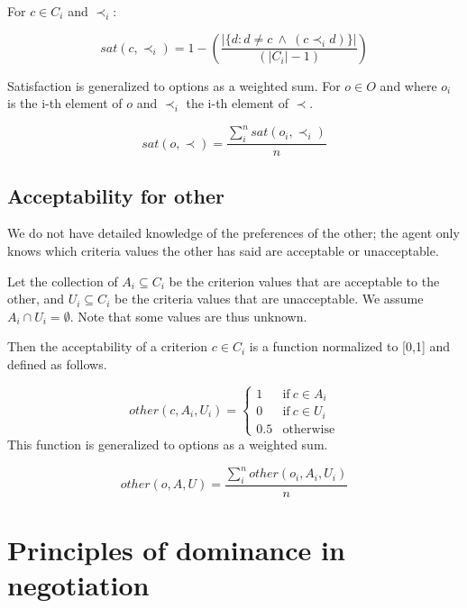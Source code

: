 \documentclass{article}
\begin{document}
		For $c \in C_i$ and $\prec_i$:
	
	$$sat(c, \prec_i) =	1 - \left( \frac{|\{d : d \neq c \  \wedge \ (c \prec_i d)\}| }{( |C_i| - 1 )}\right)  $$
	
	Satisfaction is generalized to options as a weighted sum.
	For $o \in O$ and where $o_i$ is the i-th element of $o$ and $\prec_i$ the i-th element of $\prec$.
	
	$$sat(o, \prec) = \frac{\sum_{i}^{n} sat(o_i, \prec_i) }{n} $$
	
	
	\subsection{Acceptability for other}
	
	We do not have detailed knowledge of the preferences of the other; the agent only knows which criteria values the other has said are acceptable or unacceptable.


	Let the collection of $A_i \subseteq C_i$ be the criterion values that are acceptable to the other, and $U_i \subseteq C_i$ be the criteria values that are unacceptable.  We assume $A_i \cap U_i = \emptyset$.  Note	that some values are thus unknown.

	Then the acceptability of a criterion $c \in C_i$ is a function normalized to [0,1] and defined as follows.

	$$ other(c, A_i, U_i)= \left\{\begin{array}{ll}
		1	 & \mathrm{if\ }  c \in A_i\\
		0    & \mathrm{if\ }c \in U_i\\
		0.5	 & \mathrm{otherwise}
		\end{array}\right.$$
	This function is generalized to options as a weighted sum.

	$$other(o, A, U) = \frac{ \sum_{i}^{n} other(o_i, A_i, U_i) } {n}$$ 
	
	
	\section{Principles of dominance in negotiation}
	
\end{document}
